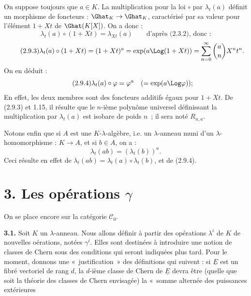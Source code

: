 On
suppose toujours que \(a\in K\). La multiplication pour la loi \(\circ\) par \(\lambda_t(a)\) définit un morphisme de foncteurs : \(\Ghat_K\to\Ghat_K\), caractérisé par sa valeur pour l'élément \(1+Xt\) de \(\Ghat(K[X])\). On a donc :
\[
  \lambda_t(a)\circ(1+Xt)=\lambda_{Xt}(a)\qquad\text{d'après (2.3.2), donc :}
\]
\begin{equation}\tag{2.9.3}
  \lambda_t(a)\circ(1+Xt)
  =(1+Xt)^a
  =\exp(a\Log(1+Xt))
  =\sum_{n=0}^{\infty}\binom{a}{n}X^nt^n .
\end{equation}
On en déduit :
\begin{equation}\tag{2.9.4}
  \lambda_t(a)\circ\varphi=\varphi^a
  \quad(=\exp(a\Log\varphi)) ;
\end{equation}
En effet, les deux membres sont des foncteurs additifs égaux pour \(1+Xt\). De (2.9.3) et 1.15, il résulte que le \(n\)-ième polynôme universel définissant la multiplication par \(\lambda_t(a)\) est isobare de poids \(n\)~; il sera noté \(R_{n,a}\).

Notons enfin que si \(A\) est une \(K\)-\(\lambda\)-algèbre, i.e. un \(\lambda\)-anneau muni d'un \(\lambda\)-homomorphisme : \(K\to A\), et si \(b\in A\), on a :
\begin{equation}\tag{2.9.5}
  \lambda_t(ab)=(\lambda_t(b))^a .
\end{equation}
Ceci résulte en effet de \(\lambda_t(ab)=\lambda_t(a)\circ\lambda_t(b)\), et de (2.9.4).

\section*{3. Les opérations \(\gamma\)}

On se place encore sur la catégorie \(\mathcal C_0\).

\textbf{3.1.} Soit \(K\) un \(\lambda\)-anneau. Nous allons définir à partir des opérations \(\lambda^i\) de \(K\) de nouvelles oérations, notées \(\gamma^i\). Elles sont destinées à introduire une notion de classes de Chern sous des conditions qui seront indiquées plus tard. Pour le moment, donnons une «~justification~» des définitions qui suivent : si \(\underline{E}\) est un fibré vectoriel de rang \(d\), la \(d\)-ième classe de Chern de \(\underline{E}\) devra être (quelle que soit la théorie des classes de Chern envisagée) la «~somme alternée des puissances extérieures 
